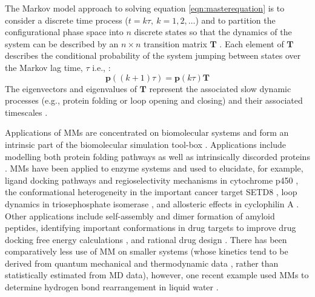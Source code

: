 The Markov model approach to solving equation \ref{eqn:masterequation} is to consider a discrete time process ($t = k\tau,\ k = 1, 2, \ldots$) and to partition the configurational phase space into $n$ discrete states so that  the dynamics of the system can be described by an $n\times n$ transition matrix $\mathbf{T}$ \cite{prinzMarkovModelsMolecular2011}. Each element of $\mathbf{T}$ describes the conditional probability of the system jumping between states over the Markov lag time, $\tau$ i.e., \cite{noeTransitionNetworksModeling2008}: 
\begin{equation}\label{eqn:discretemasterequation}
    \mathbf{p}((k+1)\tau) = \mathbf{p}(k\tau)\mathbf{T}
\end{equation}
The eigenvectors and eigenvalues of $\mathbf{T}$ represent the associated slow dynamic processes (e.g., protein folding or loop opening and closing) and their associated timescales \cite{prinzMarkovModelsMolecular2011}. 

Applications of MMs are concentrated on biomolecular systems and form an intrinsic part of the biomolecular simulation tool-box \cite{hugginsBiomolecularSimulationsDynamics2019}. Applications include modelling both protein folding pathways \cite{singhalUsingPathSampling2004,swopeDescribingProteinFolding2004} as well as intrinsically discorded proteins \cite{schorAnalyticalMethodsStructural2016a}. 
MMs have been applied to enzyme systems and used to elucidate, for example, ligand docking pathways \cite{ahalawatMappingSubstrateRecognition2018a} and regioselectivity mechanisms in cytochrome p450 \cite{dodaniDiscoveryRegioselectivitySwitch2016a}, the conformational heterogeneity in the important cancer target SETD8 \cite{chenDynamicConformationalLandscape2019a}, loop dynamics in triosephosphate isomerase \cite{LoopMotionTriosephosphate}, and allosteric effects in cyclophilin A \cite{wapeesittipanAllostericEffectsCyclophilin2019}. Other applications include self-assembly \cite{senguptaAutomatedMarkovState2019} and dimer formation \cite{leahyCoarseMasterEquations2016} of amyloid peptides, identifying important conformations in drug targets to improve drug docking free energy calculations \cite{amaroEnsembleDockingDrug2018}, and rational drug design \cite{gervasioBiomolecularSimulationsStructureBased2019}. There has been comparatively less use of MM on smaller systems (whose kinetics tend to be derived from quantum mechanical and thermodynamic data \cite{glowackiMESMEROpenSourceMaster2012, pillingMasterEquationModels2003}, rather than statistically estimated from MD data), however, one recent example used MMs to determine hydrogen bond rearrangement in liquid water \cite{schulzCollectiveHydrogenbondRearrangement2018}. 


